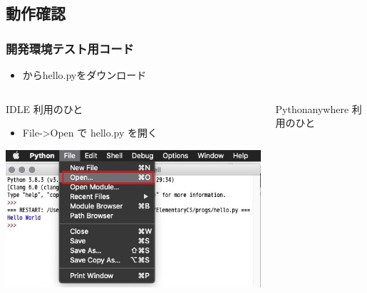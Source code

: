 \subsection{動作確認}
\begin{frame}
\frametitle{開発環境テスト用コード}
  \begin{itemize}
\item \href{https://sites.google.com/a/presystems.xyz/sample/home/elementary-computer-science}{} 
からhello.pyをダウンロード
  \end{itemize}
\vspace{-1em}
  \begin{columns}[t]
    \begin{column}{0.5\textwidth}
      \begin{itembox}{\footnotesize IDLE 利用のひと}
        \begin{itemize}
\scriptsize
\item File->Open で hello.py を開く
        \end{itemize}
\includegraphics[width=1\textwidth]{./Figure/elementaryCS-figOpenFile.jpg}
      \end{itembox}
    \end{column}
    \begin{column}{0.5\textwidth}
      \begin{itembox}{\footnotesize Pythonanywhere 利用のひと}
\scriptsize
        \begin{itemize}

\end{itemize}
\end{itembox}
\end{column}
\end{columns}
\end{frame}
